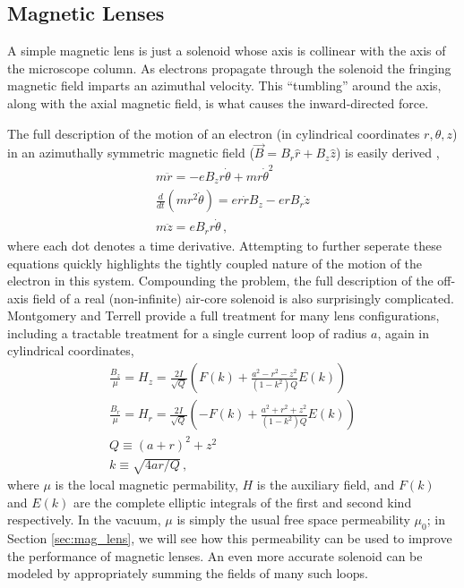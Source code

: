 \subsection{Magnetic Lenses} \label{sec:mag_lens_model}

A simple magnetic lens is just a solenoid whose axis is collinear with the axis of the microscope column.
As electrons propagate through the solenoid the fringing magnetic field imparts an azimuthal velocity.
This ``tumbling'' around the axis, along with the axial magnetic field, is what causes the inward-directed force. 

The full description of the motion of an electron (in cylindrical coordinates $r, \theta, z$) in an azimuthally symmetric magnetic field ($\vec{B} = B_r \hat{r} + B_z \hat{z}$) is easily derived \cite{el-kareh_electron_1970},
\begin{subequations} \label{eq:lens_eq_of_motion}
\begin{gather}
  m \ddot{r} = -e B_z r \dot{\theta} + m r \dot{\theta}^2                 \\
  \frac{d}{dt} ( m r^2 \dot{\theta} ) = e r \dot{r} B_z - e r B_r \dot{z} \\
  m \ddot{z} = e B_r r \dot{\theta} \,\text{,}
\end{gather}
\end{subequations}
where each dot denotes a time derivative.
Attempting to further seperate these equations quickly highlights the tightly coupled nature of the motion of the electron in this system.
Compounding the problem, the full description of the off-axis field of a real (non-infinite) air-core solenoid is also surprisingly complicated.
Montgomery and Terrell \cite{montgomery_some_1961} provide a full treatment for many lens configurations, including a tractable treatment for a single current loop of radius $a$, again in cylindrical coordinates, 
\begin{subequations} \label{eq:field_of_loop}
\begin{gather}
  \frac{B_z}{\mu} = H_z = \frac{2I}{\sqrt{Q}} \left(   F(k) + \frac{ a^2 - r^2 - z^2 }{ (1-k^2) Q } E(k) \right) \\
  \frac{B_r}{\mu} = H_r = \frac{2I}{\sqrt{Q}} \left( - F(k) + \frac{ a^2 + r^2 + z^2 }{ (1-k^2) Q } E(k) \right) \\
  Q \equiv (a+r)^2 + z^2 \\
  k \equiv \sqrt{ 4 a r / Q } \,\text{,}
\end{gather}
\end{subequations}
where $\mu$ is the local magnetic permability, $H$ is the auxiliary field, and $F(k)$ and $E(k)$ are the complete elliptic integrals of the first and second kind respectively.
In the vacuum, $\mu$ is simply the usual free space permeability $\mu_0$; in Section \ref{sec:mag_lens}, we will see how this permeability can be used to improve the performance of magnetic lenses.
An even more accurate solenoid can be modeled by appropriately summing the fields of many such loops.

